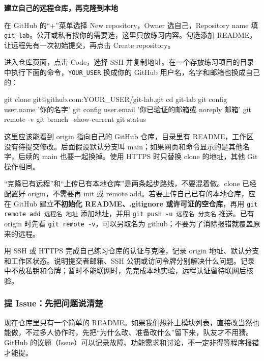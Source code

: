 \par\medskip\noindent\textbf{建立自己的远程仓库，再克隆到本地}\par
{}
\begin{example}[创建并克隆练习仓库]
在 GitHub 的“+”菜单选择 New repository，Owner 选自己，Repository name 填 \texttt{git-lab}。公开或私有按你的需要选，这里只放练习内容。勾选添加 README，让远程先有一次初始提交，再点击 Create repository。

进入仓库页面，点击 Code，选择 SSH 并复制地址。在一个存放练习项目的目录中执行下面的命令，\texttt{YOUR\_USER} 换成你的 GitHub 用户名，名字和邮箱也换成自己的：
\begin{tbash}
git clone git@github.com:YOUR_USER/git-lab.git
cd git-lab
git config user.name '你的名字'
git config user.email '你已验证的邮箱或 noreply 邮箱'
git remote -v
git branch --show-current
git status
\end{tbash}
这里应该能看到 origin 指向自己的 GitHub 仓库，目录里有 README，工作区没有待提交修改。后面假设默认分支叫 main；如果网页和命令显示的是其他名字，后续的 main 也要一起换掉。使用 HTTPS 时只替换 clone 的地址，其他 Git 操作相同。
\end{example}
\begin{note}
“克隆已有远程”和“上传已有本地仓库”是两条起步路线，不要混着做。clone 已经配置好 origin，不需要再 init 或 remote add。若要上传自己已有的本地仓库，应在 GitHub 建立\textbf{不初始化 README、.gitignore 或许可证的空仓库}，再用 \texttt{git remote add 远程名 地址} 添加地址，并用 \texttt{git push -u 远程名 分支名} 推送。已有 origin 时先看 \texttt{git remote -v}，可以另取名为 github；不要为了消除报错就覆盖原来的远程。
\end{note}
\begin{exercise}\label{ex:v1-github-access}
用 SSH 或 HTTPS 完成自己练习仓库的认证与克隆，记录 origin 地址、默认分支和工作区状态。说明提交者邮箱、SSH 公钥或访问令牌分别解决什么问题。记录中不放私钥和令牌；暂时不能联网时，先完成本地实验，远程认证留待联网后核验。
\end{exercise}

\subsubsection{提 Issue：先把问题说清楚}
\label{sec:git-issue}
现在仓库里只有一个简单的 README。如果我们想补上模块列表，直接改当然也能做，不过多人协作时，先把“为什么改、准备改什么”留下来，队友才不用猜。GitHub 的议题（Issue）可以记录故障、功能需求和讨论，不一定非得等程序报错才能提。

